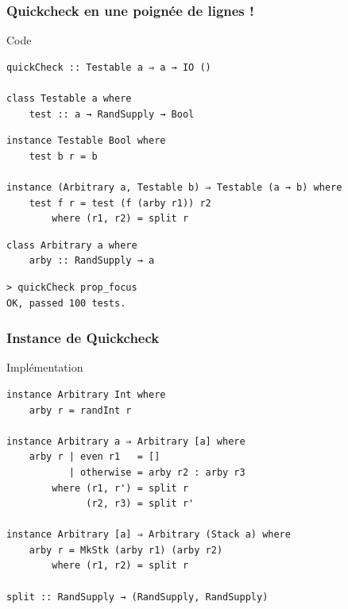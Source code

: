 \documentclass[10pt]{beamer}
\begin{document}
\begin{frame}[fragile]
\frametitle{Quickcheck en une poignée de lignes !}

\begin{block}{Code}
\begin{verbatim}
quickCheck :: Testable a ⇒ a → IO ()

class Testable a where
    test :: a → RandSupply → Bool
\end{verbatim}

\pause

\begin{verbatim}
instance Testable Bool where
    test b r = b

instance (Arbitrary a, Testable b) ⇒ Testable (a → b) where
    test f r = test (f (arby r1)) r2
        where (r1, r2) = split r
\end{verbatim}

\pause

\begin{verbatim}
class Arbitrary a where
    arby :: RandSupply → a
\end{verbatim}
\end{block}

\begin{verbatim}
> quickCheck prop_focus
OK, passed 100 tests.
\end{verbatim}

\end{frame}



\begin{frame}[fragile]
\frametitle{Instance de Quickcheck}
\begin{block}{Implémentation}
\begin{verbatim}
instance Arbitrary Int where
    arby r = randInt r

instance Arbitrary a ⇒ Arbitrary [a] where
    arby r | even r1   = []
           | otherwise = arby r2 : arby r3
        where (r1, r') = split r
              (r2, r3) = split r'

instance Arbitrary [a] ⇒ Arbitrary (Stack a) where
    arby r = MkStk (arby r1) (arby r2)
        where (r1, r2) = split r

split :: RandSupply → (RandSupply, RandSupply)
\end{verbatim}
\end{block}
\end{frame}
\end{document}
